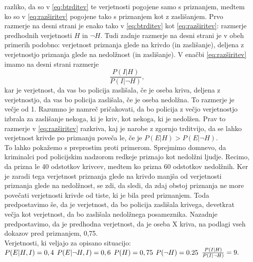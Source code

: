 \documentclass[fin1, tisk]{fmfdelo}
\theoremstyle{definition} %
\theoremstyle{trditev} %
\theoremstyle{izrek}
\begin{document}
razliko, da so v \eqref{eq:btrditev} te verjetnosti pogojene samo s priznanjem, medtem ko so v \eqref{eq:razširitev} pogojene tako s priznanjem kot z zaslišanjem. Prvo razmerje na desni strani je enako 
tako v \eqref{eq:btrditev} kot \eqref{eq:razširitev}: razmerje predhodnih verjetnosti $H$ in $\neg H$. Tudi zadnje razmerje na desni strani je v obeh primerih podobno: verjetnost priznanja glede na 
krivdo (in zaslišanje), deljena z verjetnostjo priznanja glede na nedolžnost (in zaslišanje). V enačbi \eqref{eq:razširitev} imamo na desni strani razmerje 
\[\frac{P(I \lvert H)}{P(I \lvert \neg H)},\] kar je verjetnost, da vas bo policija zaslišala, če je oseba kriva, deljena z verjetnostjo, da vas bo policija 
zaslišala, če je oseba nedolžna. To razmerje je večje od 1. Razumno je namreč pričakovati, da bo policija z večjo verjetnostjo izbrala za zaslišanje nekoga, 
ki je kriv, kot nekoga, ki je nedolžen. Prav to razmerje v \eqref{eq:razširitev} razkriva, kaj je narobe z zgornjo trditvijo, da se lahko verjetnost krivde po priznanju poveča le, 
če je $P(E \lvert H) > P(E \lvert \neg H)$. \\
To lahko pokažemo s preprostim proti primerom. Sprejmimo domnevo, da kriminalci pod policijskim nadzorom redkeje priznajo kot nedolžni ljudje. Recimo, da prizna 
le 40 odstotkov krivcev, medtem ko prizna 60 odstotkov nedolžnih. Ker je zaradi tega verjetnost priznanja glede na krivdo manjša od verjetnosti priznanja glede 
na nedolžnost, se zdi, da sledi, da zdaj obstoj priznanja ne more povečati verjetnosti krivde od tiste, ki je bila pred priznanjem. Toda predpostavimo še, 
da je verjetnost, da bo policija zaslišala krivega, devetkrat večja kot verjetnost, da bo zaslišala nedolžnega posameznika. Nazadnje predpostavimo, da je 
predhodna verjetnost, da je oseba X kriva, na podlagi vseh dokazov pred priznanjem, 0,75. \\
Verjetnosti, ki veljajo za opisano situacijo:\\ \vspace{2mm}
$P(E \lvert H, I) = 0,4\\ \vspace{2mm}$
$P(E \lvert \neg H, I) = 0,6\\ \vspace{2mm}$
$P(H) = 0,75\\ \vspace{2mm}$
$P(\neg H) = 0.25\\ \vspace{2mm}$
$\frac{P(I \lvert H)}{P(I \lvert \neg H)} = 9.\\ \vspace{2mm}$
\end{document}

